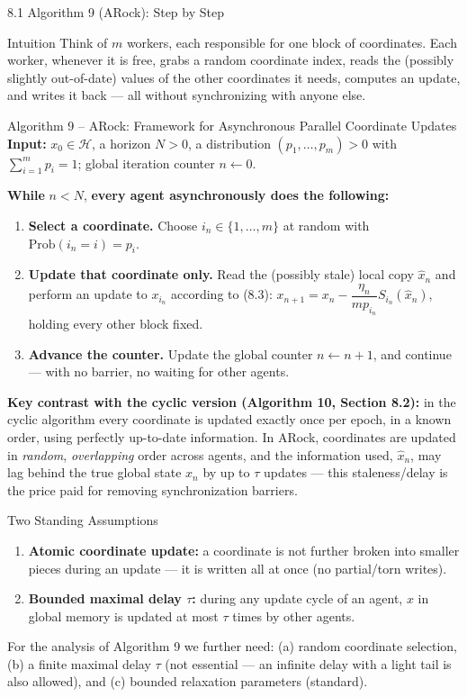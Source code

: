 \documentclass[aspectratio=169,10pt]{beamer}
\newcommand{\Hsp}{\mathcal H}
\begin{document}
\begin{frame}[allowframebreaks]{8.1 Algorithm 9 (ARock): Step by Step}

\begin{alertblock}{Intuition}
Think of $m$ workers, each responsible for one block of coordinates. Each worker, whenever it is free, grabs a random coordinate index, reads the (possibly slightly out-of-date) values of the other coordinates it needs, computes an update, and writes it back --- all without synchronizing with anyone else.
\end{alertblock}

\begin{block}{Algorithm 9 -- ARock: Framework for Asynchronous Parallel Coordinate Updates}
\textbf{Input:} $x_0\in\Hsp$, a horizon $N>0$, a distribution $(p_1,\ldots,p_m)>0$ with $\sum_{i=1}^m p_i=1$; global iteration counter $n\leftarrow 0$.

\textbf{While} $n<N$, \textbf{every agent asynchronously does the following:}
\begin{enumerate}
  \item \textbf{Select a coordinate.} Choose $i_n\in\{1,\ldots,m\}$ at random with $\mathrm{Prob}(i_n=i)=p_i$.
  \item \textbf{Update that coordinate only.} Read the (possibly stale) local copy $\hat x_n$ and perform an update to $x_{i_n}$ according to (8.3): $x_{n+1} = x_n - \dfrac{\eta_n}{mp_{i_n}}S_{i_n}(\hat x_n)$, holding every other block fixed.
  \item \textbf{Advance the counter.} Update the global counter $n\leftarrow n+1$, and continue --- with no barrier, no waiting for other agents.
\end{enumerate}
\end{block}

\textbf{Key contrast with the cyclic version (Algorithm 10, Section 8.2):} in the cyclic algorithm every coordinate is updated exactly once per epoch, in a known order, using perfectly up-to-date information. In ARock, coordinates are updated in \emph{random}, \emph{overlapping} order across agents, and the information used, $\hat x_n$, may lag behind the true global state $x_n$ by up to $\tau$ updates --- this staleness/delay is the price paid for removing synchronization barriers.

\framebreak

\begin{block}{Two Standing Assumptions}
\begin{enumerate}
  \item \textbf{Atomic coordinate update:} a coordinate is not further broken into smaller pieces during an update --- it is written all at once (no partial/torn writes).
  \item \textbf{Bounded maximal delay $\tau$:} during any update cycle of an agent, $x$ in global memory is updated at most $\tau$ times by other agents.
\end{enumerate}
For the analysis of Algorithm 9 we further need: (a) random coordinate selection, (b) a finite maximal delay $\tau$ (not essential --- an infinite delay with a light tail is also allowed), and (c) bounded relaxation parameters (standard).
\end{block}


\end{frame}
\end{document}
